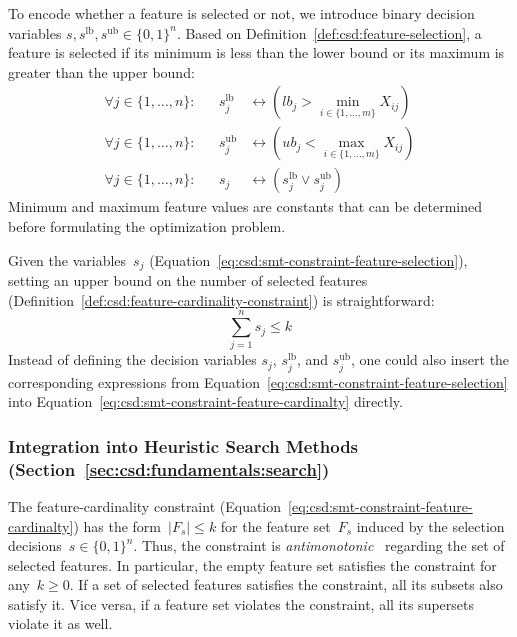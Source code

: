 \documentclass[acmsmall]{acmart} %
\theoremstyle{acmplain}
\theoremstyle{acmdefinition}
\begin{document}
To encode whether a feature is selected or not, we introduce binary decision variables $s, s^{\text{lb}}, s^{\text{ub}} \in \{0, 1\}^n$.
Based on Definition~\ref{def:csd:feature-selection}, a feature is selected if its minimum is less than the lower bound or its maximum is greater than the upper bound:
%
\begin{equation}
	\begin{aligned}
		\forall j \in \{1, \dots, n\}: & & s^{\text{lb}}_j &\leftrightarrow \left( \mathit{lb}_j > \min_{i \in \{1, \dots, m\}} X_{ij} \right) \\
		\forall j \in \{1, \dots, n\}: & &s^{\text{ub}}_j &\leftrightarrow \left( \mathit{ub}_j < \max_{i \in \{1, \dots, m\}} X_{ij} \right) \\
		\forall j \in \{1, \dots, n\}: & & s_j &\leftrightarrow \left( s^{\text{lb}}_j \lor s^{\text{ub}}_j \right)
	\end{aligned}
	\label{eq:csd:smt-constraint-feature-selection}
\end{equation}
%
Minimum and maximum feature values are constants that can be determined before formulating the optimization problem.

Given the variables~$s_j$ (Equation~\ref{eq:csd:smt-constraint-feature-selection}), setting an upper bound on the number of selected features (Definition~\ref{def:csd:feature-cardinality-constraint}) is straightforward:
%
\begin{equation}
	\sum_{j=1}^n s_j \leq k
	\label{eq:csd:smt-constraint-feature-cardinalty}
\end{equation}
%
Instead of defining the decision variables $s_j$, $s^{\text{lb}}_j$, and $s^{\text{ub}}_j$, one could also insert the corresponding expressions from Equation~\ref{eq:csd:smt-constraint-feature-selection} into Equation~\ref{eq:csd:smt-constraint-feature-cardinalty} directly.

\subsubsection{Integration into Heuristic Search Methods (Section~\ref{sec:csd:fundamentals:search})}
\label{sec:csd:approach:cardinality:heuristics}

The feature-cardinality constraint (Equation~\ref{eq:csd:smt-constraint-feature-cardinalty}) has the form~$|F_s| \leq k$ for the feature set~$F_s$ induced by the selection decisions~$s \in \{0, 1\}^n$.
Thus, the constraint is \emph{antimonotonic}~\cite{ng1998exploratory} regarding the set of selected features.
In particular, the empty feature set satisfies the constraint for any~$k \geq 0$.
If a set of selected features satisfies the constraint, all its subsets also satisfy it.
Vice versa, if a feature set violates the constraint, all its supersets violate it as well.
\end{document}

